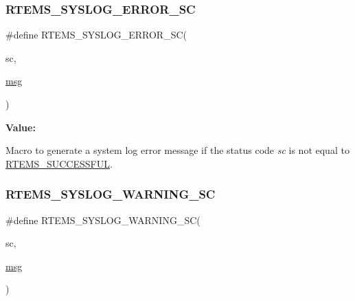 \subsubsection{\texorpdfstring{RTEMS\_SYSLOG\_ERROR\_SC}{RTEMS\_SYSLOG\_ERROR\_SC}}
{\footnotesize\ttfamily \#define R\+T\+E\+M\+S\+\_\+\+S\+Y\+S\+L\+O\+G\+\_\+\+E\+R\+R\+O\+R\+\_\+\+SC(\begin{DoxyParamCaption}\item[{}]{sc,  }\item[{}]{\mbox{\hyperlink{structmsg}{msg}} }\end{DoxyParamCaption})}

{\bfseries Value\+:}
\begin{DoxyCode}{0}
\DoxyCodeLine{  \}}

\end{DoxyCode}


Macro to generate a system log error message if the status code {\itshape sc} is not equal to \mbox{\hyperlink{group__ClassicStatus_gga545d41846817eaba6143d52ee4d9e9fea8a23e2d94778f09399da984d73562536}{R\+T\+E\+M\+S\+\_\+\+S\+U\+C\+C\+E\+S\+S\+F\+UL}}. 

\mbox{\label{group__rtems__status__checks_ga9cad738b200af0ab721806aab7f25b41}} 
\subsubsection{\texorpdfstring{RTEMS\_SYSLOG\_WARNING\_SC}{RTEMS\_SYSLOG\_WARNING\_SC}}
{\footnotesize\ttfamily \#define R\+T\+E\+M\+S\+\_\+\+S\+Y\+S\+L\+O\+G\+\_\+\+W\+A\+R\+N\+I\+N\+G\+\_\+\+SC(\begin{DoxyParamCaption}\item[{}]{sc,  }\item[{}]{\mbox{\hyperlink{structmsg}{msg}} }\end{DoxyParamCaption})}

